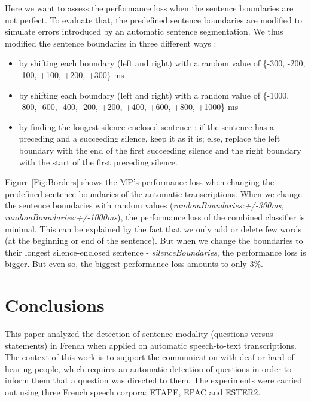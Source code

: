 \documentclass[conference]{IEEEtran}
\begin{document}
Here we want to assess the performance loss when the sentence boundaries are not perfect. To evaluate that, the predefined sentence boundaries are modified to simulate errors introduced by an automatic sentence segmentation. 
We thus modified the sentence boundaries in three different ways : 
\begin{itemize}
\item by shifting each boundary (left and right) with a random value of \{-300, -200, -100, +100, +200, +300\} ms
\item by shifting each boundary (left and right) with a random value of \{-1000, -800, -600, -400, -200, +200, +400, +600, +800, +1000\} ms
\item by finding the longest silence-enclosed sentence : if the sentence has a preceding and a succeeding silence, keep it as it is; else, replace the left boundary with the end of the first succeeding silence and the right boundary with the start of the first preceding silence.
\end{itemize} 


Figure \ref{Fig:Borders} shows the MP's performance loss when changing the predefined sentence boundaries of the automatic transcriptions. 
When we change the sentence boundaries with random values ({\it randomBoundaries:+/-300ms, randomBoundaries:+/-1000ms}), the performance loss of the combined classifier is minimal. 
This can be explained by the fact that we only add or delete few words (at the beginning or end of the sentence).
But when we change the boundaries to their longest silence-enclosed sentence - {\it silenceBoundaries}, the performance loss is bigger. 
But even so, the biggest performance loss amounts to only 3\%.


\section{Conclusions}

This paper analyzed the detection of sentence modality (questions versus statements) in French when applied on automatic speech-to-text transcriptions. The context of this work is to support the communication with deaf or hard of hearing people, which requires an automatic detection of questions in order to inform them that a question was directed to them. The experiments were carried out using three French speech corpora: ETAPE, EPAC and ESTER2. 
\end{document}
